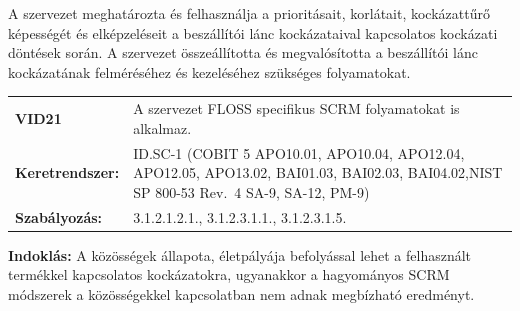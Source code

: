 \documentclass[12pt,magyar,a4paper,oneside]{scrreprt}
\begin{document}
A szervezet meghatározta és felhasználja a prioritásait, korlátait,
kockázattűrő képességét és elképzeléseit a beszállítói lánc
kockázataival kapcsolatos kockázati döntések során. A szervezet
összeállította és megvalósította a beszállítói lánc kockázatának
felméréséhez és kezeléséhez szükséges folyamatokat.

\begin{longtable}[]{@{}ll@{}}
\toprule
\endhead
\begin{minipage}[t]{0.16\columnwidth}\raggedright
\textbf{VID21}\strut
\end{minipage} & \begin{minipage}[t]{0.79\columnwidth}\raggedright
A szervezet FLOSS specifikus SCRM folyamatokat is alkalmaz.\strut
\end{minipage}\tabularnewline
\begin{minipage}[t]{0.16\columnwidth}\raggedright
\textbf{Keretrendszer:}\strut
\end{minipage} & \begin{minipage}[t]{0.79\columnwidth}\raggedright
ID.SC-1 (COBIT 5 APO10.01, APO10.04, APO12.04, APO12.05, APO13.02,
BAI01.03, BAI02.03, BAI04.02,NIST SP 800-53 Rev.~4 SA-9, SA-12,
PM-9)\strut
\end{minipage}\tabularnewline
\begin{minipage}[t]{0.16\columnwidth}\raggedright
\textbf{Szabályozás:}\strut
\end{minipage} & \begin{minipage}[t]{0.79\columnwidth}\raggedright
3.1.2.1.2.1., 3.1.2.3.1.1., 3.1.2.3.1.5.\strut
\end{minipage}\tabularnewline
\bottomrule
\end{longtable}

\textbf{Indoklás: } A közösségek állapota, életpályája befolyással lehet
a felhasznált termékkel kapcsolatos kockázatokra, ugyanakkor a
hagyományos SCRM módszerek a közösségekkel kapcsolatban nem adnak
megbízható eredményt.
\end{document}

